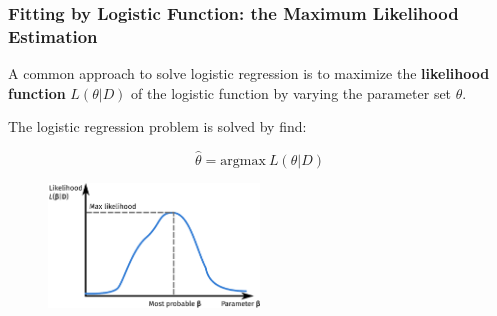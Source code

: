 \documentclass[10pt,aspectratio=169]{beamer}
\begin{document}
\begin{frame}
\begin{columns}[T]
\begin{column}{0.5\textwidth}
      \end{column}
      
    \end{columns}
  \end{frame}

    

  \begin{frame}
    \frametitle{Fitting by Logistic Function: the Maximum Likelihood Estimation}

    A common approach to solve logistic regression is to maximize the
    \textbf{likelihood function} $L(\theta|D)$ of the logistic function by varying the
    parameter set $\theta$.

    The logistic regression problem is solved by find:

    \begin{equation*}
      \hat{\theta} = \mathrm{argmax}\ L(\theta|D)
    \end{equation*}
    
         \begin{figure}[t]
           \includegraphics[width=0.5\textwidth]{images/likelihood.pdf}
         \end{figure}

    
  \end{frame}
\end{document}
